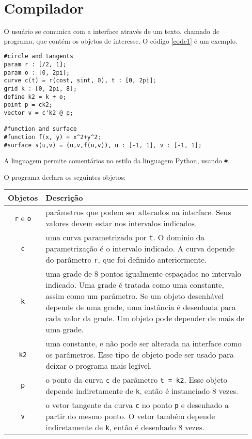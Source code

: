 \chapter{Compilador}
\label{compiler}

O usuário se comunica com a interface através de um texto, chamado de programa,
que contém os objetos de interesse.
O código \ref{code1} é um exemplo.
\begin{lstlisting}[caption=Exemplo de objetos,label=code1]
#circle and tangents
param r : [/2, 1];
param o : [0, 2pi];
curve c(t) = r(cost, sint, 0), t : [0, 2pi];
grid k : [0, 2pi, 8];
define k2 = k + o;
point p = ck2;
vector v = c'k2 @ p;

#function and surface
#function f(x, y) = x^2+y^2;
#surface s(u,v) = (u,v,f(u,v)), u : [-1, 1], v : [-1, 1];
\end{lstlisting}

A linguagem permite comentários no estilo da linguagem Python, usando \texttt{\#}.

O programa declara os seguintes objetos:

\begin{centering}
\begin{tabularx}{\textwidth}{||c|X||}
    \cline{1-2}
    Objetos & Descrição \\ \hline \hline
    
    \texttt{r} e \texttt{o} & parâmetros que podem ser alterados na interface.
    Seus valores devem estar nos intervalos indicados. \\ \hline
    
    \texttt{c} & uma curva parametrizada por \texttt{t}.
    O domínio da parametrização é o intervalo indicado.
    A curva depende do parâmetro \texttt{r}, que foi definido anteriormente. \\ \hline
    
    \texttt{k} & uma grade de 8 pontos igualmente espaçados no intervalo indicado.
    Uma grade é tratada como uma constante, assim como um parâmetro.
    Se um objeto desenhável depende de uma grade, uma instância é desenhada para cada valor da grade.
    Um objeto pode depender de mais de uma grade. \\ \hline
    
    \texttt{k2} & uma constante, e não pode ser alterada na interface como os parâmetros.
    Esse tipo de objeto pode ser usado para deixar o programa mais legível. \\ \hline
    
    \texttt{p} & o ponto da curva \texttt{c} de parâmetro \texttt{t = k2}.
    Esse objeto depende indiretamente de \texttt{k}, então é instanciado 8 vezes. \\ \hline
    
    \texttt{v} & o vetor tangente da curva \texttt{c} no ponto \texttt{p} 
    e desenhado a partir do mesmo ponto.
    O vetor também depende indiretamente de \texttt{k}, então é desenhado 8 vezes. \\ \hline
    \cline{1-2}
\end{tabularx}
\end{centering}


